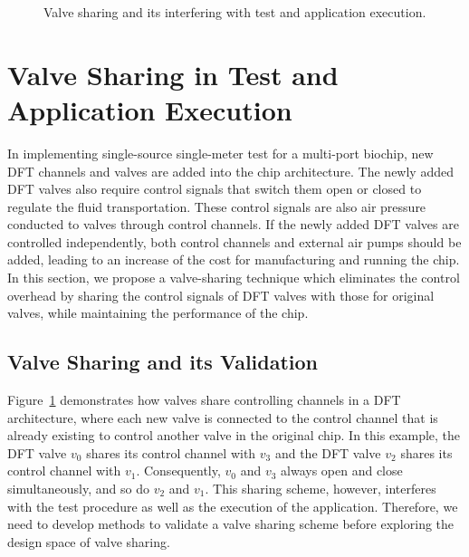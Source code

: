 
\begin{figure}
\figurefontsize
\centering

\caption{Valve sharing and its interfering with test and application execution.}
\label{fig:valveSharing}
\end{figure}

\section{Valve Sharing in Test and Application
Execution}\label{sec:valve_sharing}

In implementing single-source single-meter test for a multi-port
biochip, new DFT channels and valves are added into the chip architecture. The
newly added DFT valves also require control signals that switch them open or
closed to regulate the fluid transportation. These control signals are also
air pressure conducted to valves through control channels. If the newly added
DFT valves are controlled independently, both control channels and 
external air pumps should be added, leading to an increase of the cost for manufacturing
and running the chip.  In this section, we propose a valve-sharing technique
which eliminates the control overhead by sharing the control signals of
DFT valves with those for original valves, while maintaining the performance
of the chip.

\subsection{Valve Sharing and its Validation}\label{sec:validation}

Figure~\ref{fig:valveSharing} demonstrates how valves share controlling
channels in a DFT architecture, where each new valve is connected to the
control channel that is already existing to control another valve in the
original chip.  In this example, the DFT valve $v_0$ shares its control
channel with $v_3$ and the DFT valve $v_2$ shares its control channel with
$v_1$.  Consequently, $v_0$ and $v_3$ always open and close simultaneously,
and so do $v_2$ and $v_1$. This sharing scheme, however, interferes with the
test procedure as well as the execution of the application.  Therefore, we
need to develop methods to validate a valve sharing scheme before exploring the
design space of valve sharing.


